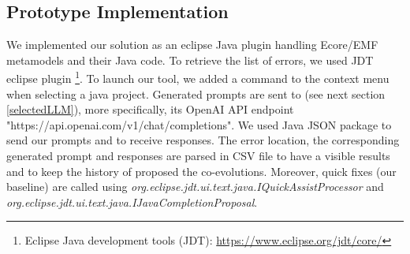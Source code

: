 \subsection{Prototype Implementation}
We implemented our solution as an eclipse Java plugin handling Ecore/EMF metamodels and their Java code. To retrieve the list of errors, we used JDT eclipse plugin \footnote{Eclipse Java development tools (JDT): \url{https://www.eclipse.org/jdt/core/}}. To launch our tool, we added a command to the context menu when selecting a java project. Generated prompts are sent to \LLM (see next section \ref{selectedLLM}), more specifically, its OpenAI API endpoint "https://api.openai.com/v1/chat/completions". We used Java JSON package to send our prompts and to receive \LLM responses. The error location, the corresponding generated prompt and \LLM responses are parsed in CSV file to have a visible results and to keep the history of proposed the co-evolutions.
Moreover, quick fixes (our baseline) are called using 
\textit{org.eclipse.jdt.ui.text.java.IQuickAssistProcessor} and \textit{org.eclipse.jdt.ui.text.java.IJavaCompletionProposal}.


